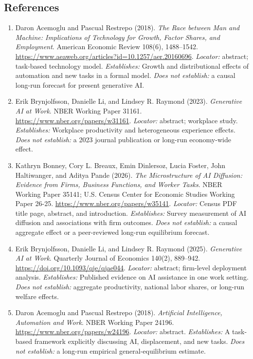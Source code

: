\documentclass[11pt,a4paper]{article}
\begin{document}
\subsection*{References}

\begin{enumerate}

\item[S1] Daron Acemoglu and Pascual Restrepo (2018). \emph{The Race between Man and Machine: Implications of Technology for Growth, Factor Shares, and Employment}. American Economic Review 108(6), 1488--1542. \url{https://www.aeaweb.org/articles?id=10.1257/aer.20160696}. \textit{Locator:} abstract; task-based technology model. \textit{Establishes:} Growth and distributional effects of automation and new tasks in a formal model. \textit{Does not establish:} a causal long-run forecast for present generative AI.

\item[S2] Erik Brynjolfsson, Danielle Li, and Lindsey R. Raymond (2023). \emph{Generative AI at Work}. NBER Working Paper 31161. \url{https://www.nber.org/papers/w31161}. \textit{Locator:} abstract; workplace study. \textit{Establishes:} Workplace productivity and heterogeneous experience effects. \textit{Does not establish:} a 2023 journal publication or long-run economy-wide effect.

\item[S3] Kathryn Bonney, Cory L. Breaux, Emin Dinlersoz, Lucia Foster, John Haltiwanger, and Aditya Pande (2026). \emph{The Microstructure of AI Diffusion: Evidence from Firms, Business Functions, and Worker Tasks}. NBER Working Paper 35141; U.S. Census Center for Economic Studies Working Paper 26-25. \url{https://www.nber.org/papers/w35141}. \textit{Locator:} Census PDF title page, abstract, and introduction. \textit{Establishes:} Survey measurement of AI diffusion and associations with firm outcomes. \textit{Does not establish:} a causal aggregate effect or a peer-reviewed long-run equilibrium forecast.

\item[S4] Erik Brynjolfsson, Danielle Li, and Lindsey R. Raymond (2025). \emph{Generative AI at Work}. Quarterly Journal of Economics 140(2), 889--942. \url{https://doi.org/10.1093/qje/qjae044}. \textit{Locator:} abstract; firm-level deployment analysis. \textit{Establishes:} Published evidence on AI assistance in one work setting. \textit{Does not establish:} aggregate productivity, national labor shares, or long-run welfare effects.

\item[S5] Daron Acemoglu and Pascual Restrepo (2018). \emph{Artificial Intelligence, Automation and Work}. NBER Working Paper 24196. \url{https://www.nber.org/papers/w24196}. \textit{Locator:} abstract. \textit{Establishes:} A task-based framework explicitly discussing AI, displacement, and new tasks. \textit{Does not establish:} a long-run empirical general-equilibrium estimate.

\end{enumerate}
\end{document}
